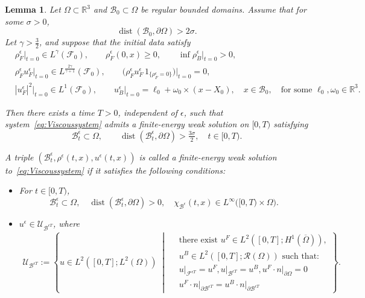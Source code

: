 \documentclass[11pt,twoside,reqno]{amsart}
\numberwithin{equation}{section}
\numberwithin{figure}{section}
\newtheorem{lemma}{Lemma}[section]
\begin{document}
\begin{lemma}\label{lem:ExsitenceofViscousSystem}
Let $\Omega \subset \mathbb{R}^3$ and $\mathcal{B}_0 \subset \Omega$ be regular bounded domains. 
Assume that for some $\sigma > 0$,
\[
\operatorname{dist}(\mathcal{B}_0, \partial \Omega) > 2\sigma.
\]
Let $\gamma > \tfrac{3}{2}$, and suppose that the initial data satisfy
\begin{equation*}
\begin{aligned}
&\rho_F^\epsilon\big|_{t=0} \in L^{\gamma}(\mathcal{F}_0), 
\qquad \rho_F^\epsilon(0,x) \ge 0, 
\qquad \inf\rho_B^\epsilon\big|_{t=0} > 0,\\[2pt]
&\rho_F^\epsilon u_F^\epsilon\big|_{t=0} \in L^{\frac{2\gamma}{\gamma+1}}(\mathcal{F}_0), 
\qquad \big(\rho_F^\epsilon u_F^\epsilon\, 1_{\{\rho_F^\epsilon=0\}}\big)\big|_{t=0} = 0,\\[2pt]
&|u_F^\epsilon|^2\big|_{t=0} \in L^1(\mathcal{F}_0), 
\qquad u_B^\epsilon\big|_{t=0} = \ell_0 + \omega_0 \times (x-X_0), \quad x \in \mathcal{B}_0,
\quad \text{for some }\ell_0,\omega_0 \in \mathbb{R}^3.
\end{aligned}
\end{equation*}

Then there exists a time $T>0$, independent of $\epsilon$, such that system~\eqref{eq:Viscoussystem} admits a finite-energy weak solution on $[0,T)$ satisfying
\[
\mathcal{B}_t^\epsilon \subset \Omega, 
\qquad \operatorname{dist}(\mathcal{B}_t^\epsilon, \partial \Omega) > \tfrac{3\sigma}{2}, 
\quad t \in [0,T).
\]

A triple $(\mathcal{B}_t^\epsilon, \rho^\epsilon(t,x), u^\epsilon(t,x))$ is called a \emph{finite-energy weak solution} to~\eqref{eq:Viscoussystem} if it satisfies the following conditions:


\begin{itemize}
\item[1.] For $t \in [0,T)$,
\[
\mathcal{B}_t^\epsilon \subset \Omega,\quad
\operatorname{dist}(\mathcal{B}_t^\epsilon, \partial \Omega) > 0,\quad
\chi_{\mathcal{B}^\epsilon}(t,x)  \in L^\infty\big([0,T)\times\Omega\big).
\]

\item[2.] $u^\epsilon \in \mathcal{U}_{\mathcal{B}^{\epsilon T}}$, where
\begin{equation}\label{eq:DefofViscosVelocityField}
    \begin{aligned}
 \mathcal{U}_{\mathcal{B}^{\epsilon T}} :=\left\{
u \in L^2([0,T]; L^2(\Omega)) \; \middle|\; 
\begin{aligned}
&\text{there exist } u^F \in L^2([0,T]; H^1(\overline{\Omega})),\\& 
u^B \in L^2([0,T]; \mathcal{R}(\Omega)) \text{ such that:~} \\& u\big|_{\mathcal{F}^{\epsilon T}} = u^F, 
u\big|_{ \mathcal{B}^{\epsilon T}} = u^B, u^F \cdot n \big|_{\partial \Omega}= 0 \\
& u^F \cdot n\big|_{\partial \mathcal{B}^{\epsilon T}} = u^B \cdot n\big|_{\partial \mathcal{B}^{\epsilon T}}
\end{aligned}
\right\}.
    \end{aligned}
\end{equation}



\end{itemize}
\end{lemma}
\end{document}

